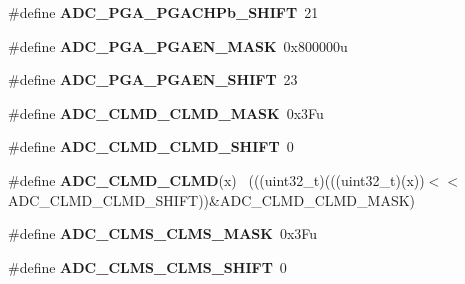 \begin{DoxyCompactItemize}
\item 
\hypertarget{group___a_d_c___register___masks_gabafe10d6780791ba05d9a4b82263e597}{}\#define {\bfseries A\+D\+C\+\_\+\+P\+G\+A\+\_\+\+P\+G\+A\+C\+H\+Pb\+\_\+\+S\+H\+I\+F\+T}~21\label{group___a_d_c___register___masks_gabafe10d6780791ba05d9a4b82263e597}

\item 
\hypertarget{group___a_d_c___register___masks_ga43041669f7d4bc8d046ed58fd9074e2b}{}\#define {\bfseries A\+D\+C\+\_\+\+P\+G\+A\+\_\+\+P\+G\+A\+E\+N\+\_\+\+M\+A\+S\+K}~0x800000u\label{group___a_d_c___register___masks_ga43041669f7d4bc8d046ed58fd9074e2b}

\item 
\hypertarget{group___a_d_c___register___masks_gaef8ffbfc9f36f616ad9e05418c5fa5bd}{}\#define {\bfseries A\+D\+C\+\_\+\+P\+G\+A\+\_\+\+P\+G\+A\+E\+N\+\_\+\+S\+H\+I\+F\+T}~23\label{group___a_d_c___register___masks_gaef8ffbfc9f36f616ad9e05418c5fa5bd}

\item 
\hypertarget{group___a_d_c___register___masks_ga45c4117ad9fba213c3d338cf6280cb75}{}\#define {\bfseries A\+D\+C\+\_\+\+C\+L\+M\+D\+\_\+\+C\+L\+M\+D\+\_\+\+M\+A\+S\+K}~0x3\+Fu\label{group___a_d_c___register___masks_ga45c4117ad9fba213c3d338cf6280cb75}

\item 
\hypertarget{group___a_d_c___register___masks_ga872bf108b50c6dd439ddc1294f104fe5}{}\#define {\bfseries A\+D\+C\+\_\+\+C\+L\+M\+D\+\_\+\+C\+L\+M\+D\+\_\+\+S\+H\+I\+F\+T}~0\label{group___a_d_c___register___masks_ga872bf108b50c6dd439ddc1294f104fe5}

\item 
\hypertarget{group___a_d_c___register___masks_gada01491a34a2a912a7cdbccac2134da4}{}\#define {\bfseries A\+D\+C\+\_\+\+C\+L\+M\+D\+\_\+\+C\+L\+M\+D}(x)                                              ~(((uint32\+\_\+t)(((uint32\+\_\+t)(x))$<$$<$A\+D\+C\+\_\+\+C\+L\+M\+D\+\_\+\+C\+L\+M\+D\+\_\+\+S\+H\+I\+F\+T))\&A\+D\+C\+\_\+\+C\+L\+M\+D\+\_\+\+C\+L\+M\+D\+\_\+\+M\+A\+S\+K)\label{group___a_d_c___register___masks_gada01491a34a2a912a7cdbccac2134da4}

\item 
\hypertarget{group___a_d_c___register___masks_ga108adc09b24001dddfd498e14213fea6}{}\#define {\bfseries A\+D\+C\+\_\+\+C\+L\+M\+S\+\_\+\+C\+L\+M\+S\+\_\+\+M\+A\+S\+K}~0x3\+Fu\label{group___a_d_c___register___masks_ga108adc09b24001dddfd498e14213fea6}

\item 
\hypertarget{group___a_d_c___register___masks_gabe0e92adb89c86d0523958a947288808}{}\#define {\bfseries A\+D\+C\+\_\+\+C\+L\+M\+S\+\_\+\+C\+L\+M\+S\+\_\+\+S\+H\+I\+F\+T}~0\label{group___a_d_c___register___masks_gabe0e92adb89c86d0523958a947288808}


\end{DoxyCompactItemize}
